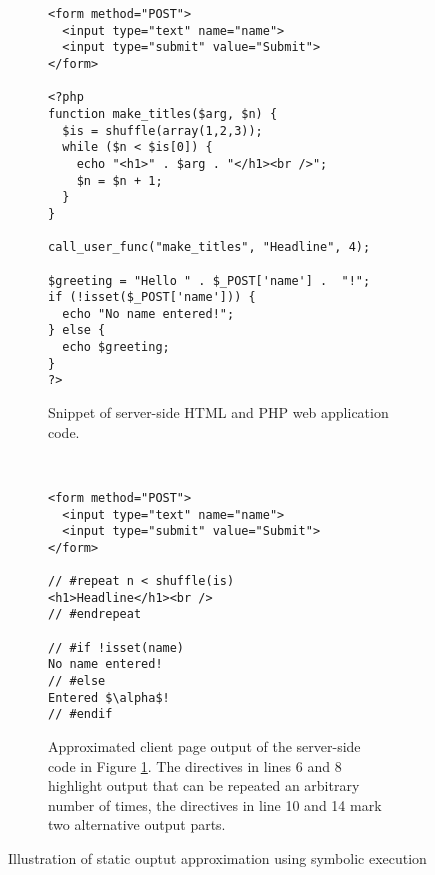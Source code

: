 \documentclass[sigconf]{acmart}
\begin{document}
\begin{figure}[t]
	\centering
	\begin{subfigure}[center]{0.48\textwidth}%
\begin{lstlisting}
<form method="POST">
  <input type="text" name="name">
  <input type="submit" value="Submit">
</form>

<?php
function make_titles($arg, $n) {
  $is = shuffle(array(1,2,3));
  while ($n < $is[0]) {
    echo "<h1>" . $arg . "</h1><br />";
    $n = $n + 1;
  }
}
  
call_user_func("make_titles", "Headline", 4);

$greeting = "Hello " . $_POST['name'] .  "!";
if (!isset($_POST['name'])) {
  echo "No name entered!";
} else {
  echo $greeting;
}
?>
\end{lstlisting}
		\caption{Snippet of server-side HTML and PHP web application code.
		\label{fig:web_application}}
    \end{subfigure}

	\vspace{2mm}    
    
    ~ %
    \begin{subfigure}[center]{0.48\textwidth}
\begin{lstlisting}[mathescape]
<form method="POST">
  <input type="text" name="name">
  <input type="submit" value="Submit">
</form>

// #repeat n < shuffle(is)
<h1>Headline</h1><br />
// #endrepeat

// #if !isset(name)
No name entered!
// #else
Entered $\alpha$!
// #endif

\end{lstlisting}
		\caption{
			Approximated client page output of the server-side code in Figure
			\ref{fig:web_application}. The directives in lines 6 and 8 highlight output
			that can be repeated an arbitrary number of times, the directives in line 10
			and 14 mark two alternative output parts.
			\label{fig:output_example}
		}
    \end{subfigure}
    \vspace{2mm}
    \caption{
    	Illustration of static ouptut approximation using symbolic
    	execution
    	\label{fig:code_example}
    }
\end{figure}
\end{document}
